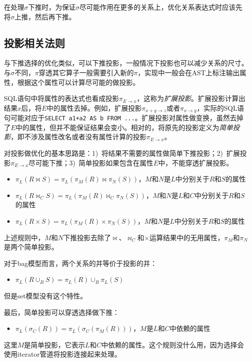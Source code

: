 在处理$\sigma$下推时，为保证$\sigma$尽可能作用在更多的关系上，优化关系表达式时应该先将$\sigma$上推，然后再下推。

\subsection{投影相关法则}

与下推选择的优化类似，可以下推投影，一般情况下投影也可以减少关系的尺寸。与$\sigma$不同，$\pi$穿透其它算子一般需要引入新的$\pi$，实现中一般会在AST上标注输出属性，根据这个属性可以计算尽可能的做投影。

SQL语句中将属性的表达式也看成投影$\pi_{E \rightarrow x}$，这称为\emph{扩展投影}。扩展投影计算出结果$x$后，将$E$中的属性去掉。例如，扩展投影$\pi_{x+y \rightarrow z}$或者$\pi_{x \rightarrow y}$，实际的SQL语句可能对应于\texttt{SELECT a1+a2 AS b FROM ...}。扩展投影对属性做变换，虽然去掉了$E$中的属性，但并不能保证结果会变小。相对的，将原先的投影定义为\emph{简单投影}，即不涉及属性改名或者没有属性计算的投影$\pi_{E \rightarrow x}$。

对投影做优化的基本思路是：1)~将结果不需要的属性做简单下推投影；2)~扩展投影$\pi_{E \rightarrow x}$尽可能下推；3)~简单投影如果包含在属性$E$中，不能穿透扩展投影。

\begin{itemize}
    \item $\pi_L(R \bowtie S) = \pi_L(\pi_M(R) \bowtie \pi_N(S))$，$M$和$N$是$L$中分别关于$R$和$S$的属性
    \item $\pi_L(R \bowtie_C S) = \pi_L(\pi_M(R) \bowtie_C \pi_N(S))$，$M$和$N$是$L$和$C$中分别关于$R$和$S$的属性
    \item $\pi_L(R \times S) = \pi_L(\pi_M(R) \times \pi_N(S))$，$M$和$N$是$L$中分别关于$R$和$S$的属性
\end{itemize}

上述规则中，$M$和$N$下推投影去除了$\bowtie$、$\bowtie_C$和$\times$运算结果中的无用属性，$\pi_M$和$\pi_N$是两个简单投影。

对于bag模型而言，两个关系的并等价于投影的并：
\begin{itemize}
    \item $\pi_L(R \cup_B S) = \pi_L(R) \cup_B \pi_L(S)$
\end{itemize}
但是set模型没有这个特性。

最后，简单投影可以穿透选择做下推：
\begin{itemize}
    \item $\pi_L(\sigma_C(R)) = \pi_L(\sigma_C(\pi_M(R)))$，$M$是$L$和$C$中依赖的属性
\end{itemize}
这里$M$是简单投影，它表示$L$和$C$中依赖的属性。这个规则没什么用，因为选择会使用iterator管道将投影连接起来处理。

